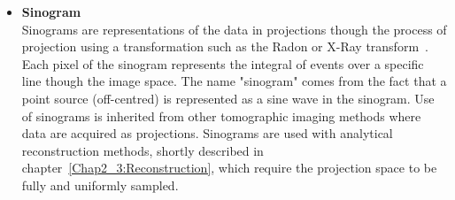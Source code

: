 \begin{itemize}
\item\textbf{Sinogram}\\
Sinograms are representations of the data in projections though the process of projection using a transformation such as the Radon or X-Ray transform~\cite{Natterer1986}. Each pixel of the sinogram represents the integral of events over a specific line though the image space. The name "sinogram" comes from the fact that a point source (off-centred) is represented as a sine wave in the sinogram.
Use of sinograms is inherited from other tomographic imaging methods where data are acquired as projections. Sinograms are used with analytical reconstruction methods, shortly described in chapter~\ref{Chap2_3:Reconstruction}, which require the projection space to be fully and uniformly sampled.
%
%
\end{itemize}

